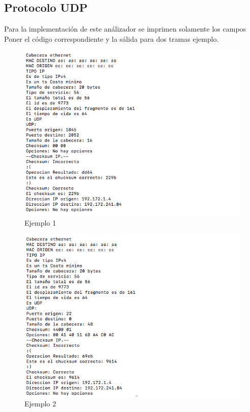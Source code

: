 \subsection{Protocolo UDP}
Para la implementaci\'on de este an\'alizador se imprimen solamente los campos 
Poner el c\'odigo correspondiente y la s\'alida para dos tramas ejemplo. 
		\begin{figure}[h]
			\centering		
			\includegraphics[width=\textwidth]{udp1}
			\caption{Ejemplo 1}
		\end{figure}
	\begin{figure}[h]
			\centering		
			\includegraphics[width=\textwidth]{udp2}
			\caption{Ejemplo 2}
		\end{figure}
\clearpage